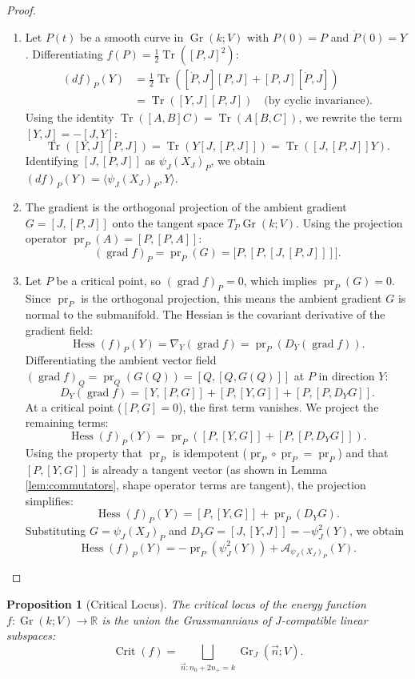 \documentclass[12pt, final]{article}
\def\R{\mathbb{R}}
\def\A{\mathcal{A}}
\def\pr{\operatorname{pr}}
\def\Crit{\operatorname{Crit}}
\def\grad{\operatorname{grad}}
\def\Hess{\operatorname{Hess}}
\def\Gr{\operatorname{Gr}}
\def\Tr{\operatorname{Tr}}
\newtheorem{proposition}[theorem]{Proposition}
\begin{document}
\begin{proof}\
\begin{enumerate}
 \item Let $P(t)$ be a smooth curve in $\Gr(k; V)$ with $P(0) = P$ and $\dot{P}(0) = Y$. Differentiating $f(P) = \frac{1}{2} \Tr([P, J]^2)$:
\begin{align*}
(df)_P(Y) &= \frac{1}{2} \Tr\left( [\dot{P}, J] [P, J] + [P, J] [\dot{P}, J] \right) \\
&= \Tr\left( [Y, J] [P, J] \right) \quad \text{(by cyclic invariance)}.
\end{align*}
Using the identity $\Tr([A, B]C) = \Tr(A [B, C])$, we rewrite the term $[Y, J] = -[J, Y]$:
\[
\Tr( [Y, J] [P, J] ) = \Tr( Y [J, [P, J]] ) = \Tr( [J, [P, J]] Y ).
\]
Identifying $[J, [P, J]]$ as $\psi_J(X_J)_P$, we obtain $(df)_P(Y) = \langle \psi_J(X_J)_P, Y \rangle$.

\item The gradient is the orthogonal projection of the ambient gradient $G = [J, [P, J]]$ onto the tangent space $T_P \Gr(k; V)$. Using the projection operator $\pr_P(A) = [P, [P, A]]$:
\[
(\grad f)_P = \pr_P(G) = \big[ P, [P, [J, [P, J]]] \big].
\]

\item Let $P$ be a critical point, so $(\grad f)_P = 0$, which implies $\pr_P(G) = 0$. Since $\pr_P$ is the orthogonal projection, this means the ambient gradient $G$ is normal to the submanifold.
The Hessian is the covariant derivative of the gradient field:
\[
\Hess(f)_P(Y) = \nabla_Y (\grad f) = \pr_P \left( D_Y (\grad f) \right).
\]
Differentiating the ambient vector field $(\grad f)_Q = \pr_Q(G(Q)) = [Q, [Q, G(Q)]]$ at $P$ in direction $Y$:
\[
D_Y (\grad f) = [Y, [P, G]] + [P, [Y, G]] + [P, [P, D_Y G]].
\]
At a critical point ($[P, G]=0$), the first term vanishes. We project the remaining terms:
\[
\Hess(f)_P(Y) = \pr_P \left( [P, [Y, G]] + [P, [P, D_Y G]] \right).
\]
Using the property that $\pr_P$ is idempotent ($\pr_P \circ \pr_P = \pr_P$) and that $[P, [Y, G]]$ is already a tangent vector (as shown in Lemma \ref{lem:commutators}, shape operator terms are tangent), the projection simplifies:
\[
\Hess(f)_P(Y) = [P, [Y, G]] + \pr_P( D_Y G ).
\]
Substituting $G = \psi_J(X_J)_P$ and $D_Y G = [J, [Y, J]] = -\psi_J^2(Y)$, we obtain
\[
\Hess(f)_P(Y) = -\pr_P (\psi_J^2(Y)) + \A_{\psi_J(X_J)_P}(Y). 
\]
\end{enumerate}
\end{proof}

\begin{proposition}[Critical Locus] \label{prop:critical_locus}
The critical locus of the energy function $f: \Gr(k; V) \to \R$ is  the union the Grassmannians of $J$-compatible linear subspaces:
\[ \Crit(f) = \bigsqcup_{\vec{n}: n_0 + 2n_+ = k} \Gr_J(\vec{n}; V).\]
\end{proposition}
\end{document}
